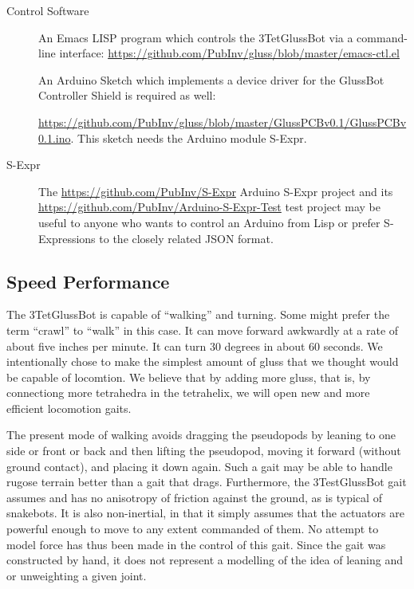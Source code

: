\documentclass[11pt]{article}
\begin{document}
\begin{description}
\item [Control Software]
An Emacs LISP program which controls the 3TetGlussBot via a command-line interface:
\href{https://github.com/PubInv/gluss/blob/master/emacs-ctl.el}{https://github.com/PubInv/gluss/blob/master/emacs-ctl.el}

An Arduino Sketch which implements a device driver for the GlussBot Controller Shield is required as well:

\href{https://github.com/PubInv/gluss/blob/master/GlussPCBv0.1/GlussPCBv0.1.ino}
     {https://github.com/PubInv/gluss/blob/master/GlussPCBv0.1/GlussPCBv0.1.ino}.
     This sketch needs the Arduino module S-Expr.
     
\item [S-Expr]
  The \href{https://github.com/PubInv/S-Expr}{https://github.com/PubInv/S-Expr} Arduino S-Expr project and its
  \href{https://github.com/PubInv/Arduino-S-Expr-Test}{https://github.com/PubInv/Arduino-S-Expr-Test} test project
  may be useful to anyone who wants to control an Arduino from Lisp or prefer S-Expressions to the closely related JSON format.

  
\end{description}

\subsection{Speed Performance}

The 3TetGlussBot is capable of ``walking'' and turning. Some might prefer the term ``crawl'' to ``walk'' in
this case. It can move forward awkwardly at a rate
of about five inches per minute. It can turn 30 degrees in about 60 seconds.
We intentionally chose to make the simplest amount of gluss that we thought would be capable of locomtion.
We believe that by adding more gluss, that is, by connectiong more tetrahedra in the tetrahelix,
we will open new and more efficient locomotion gaits.

The present mode of walking avoids dragging the pseudopods by leaning to one side or front or back and
then lifting the pseudopod, moving it forward (without ground contact), and placing it down again.
Such a gait may be able to handle rugose terrain better than a gait that drags. Furthermore, the
3TestGlussBot gait assumes and has no anisotropy of friction against the ground, as is typical
of snakebots.
It is also non-inertial, in that it simply assumes that the actuators are powerful enough to
move to any extent commanded of them. No attempt to model force has thus been made in the control of this gait.
Since the gait was constructed by hand, it does not represent a modelling of the idea of leaning and or
unweighting a given joint.
\end{document}

